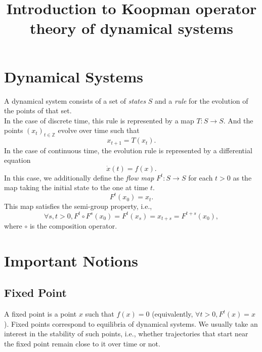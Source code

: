 \documentclass{article}
\def\Z{\mathbb{Z}}
\begin{document}
\title{Introduction to Koopman operator theory of dynamical systems}
\author{}
\date{}
\maketitle

\section{Dynamical Systems}%
\label{sec:dynamical_systems}

A dynamical system consists of a set of \textit{states}  $S$ and a
\textit{rule}  for the evolution of the points of that set.\\
In the case of discrete time, this rule is represented by a map $T:S\to S$.
And the points $(x_t)_{t\in \Z}$ evolve over time such that
\begin{equation}
    x_{t+1} = T(x_t).
\end{equation}
In the case of continuous time, the evolution rule is represented by a
differential equation
\begin{equation}
    \dot x(t) = f(x).
    \label{diff_eq}
\end{equation}
In this case, we additionally define the \textit{flow map} $F^t:S\to S$ for
each $t > 0$ as the map taking the initial state to the one at time $t$.
\begin{equation}
    F^t(x_0) = x_t.
    \label{flow}
\end{equation}
This map satisfies the semi-group property, i.e.,
\begin{equation}
    \forall s, t > 0, F^t \circ F^s(x_0) = F^t(x_s) = x_{t+s} = F^{t+s}(x_0),
\end{equation}
where $\circ$ is the composition operator.

\section{Important Notions}%
\label{sec:important_notions}

\subsection{Fixed Point}%
\label{sub:fixed_point}

A fixed point is a point $x$ such that $f(x)=0$ (equivalently, $\forall t > 0,
F^t(x)=x$).
Fixed points correspond to equilibria of dynamical systems.
We usually take an interest in the stability of such points, i.e., whether
trajectories that start near the fixed point remain close to it over time or
not.
\end{document}
